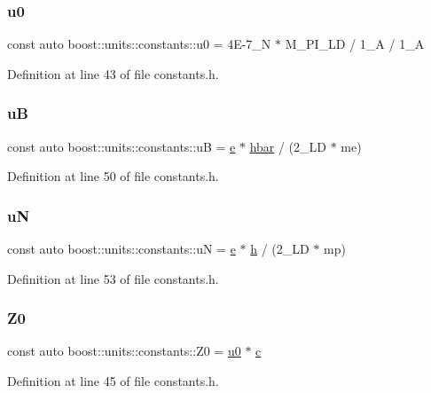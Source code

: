 \subsubsection{\texorpdfstring{u0}{u0}}
{\footnotesize\ttfamily const auto boost\+::units\+::constants\+::u0 = 4\+E-\/7\+\_\+\+N $\ast$ M\+\_\+\+P\+I\+\_\+\+L\+D / 1\+\_\+\+A / 1\+\_\+A}



Definition at line 43 of file constants.\+h.

\hypertarget{namespaceboost_1_1units_1_1constants_a872677eba6350c8679a44ffcec5f4af4}{}\label{namespaceboost_1_1units_1_1constants_a872677eba6350c8679a44ffcec5f4af4} 
\subsubsection{\texorpdfstring{uB}{uB}}
{\footnotesize\ttfamily const auto boost\+::units\+::constants\+::uB = \hyperlink{namespaceboost_1_1units_1_1constants_a0e10024b337b34c7f7300c67f0e9fcb1}{e} $\ast$ \hyperlink{namespaceboost_1_1units_1_1constants_a0203c96d139e639b8ee536cbc010c7bd}{hbar} / (2\+\_\+\+L\+D $\ast$ me)}



Definition at line 50 of file constants.\+h.

\hypertarget{namespaceboost_1_1units_1_1constants_a53dd16f6c94ac3e15d8db5725f0bd899}{}\label{namespaceboost_1_1units_1_1constants_a53dd16f6c94ac3e15d8db5725f0bd899} 
\subsubsection{\texorpdfstring{uN}{uN}}
{\footnotesize\ttfamily const auto boost\+::units\+::constants\+::uN = \hyperlink{namespaceboost_1_1units_1_1constants_a0e10024b337b34c7f7300c67f0e9fcb1}{e} $\ast$ \hyperlink{namespaceboost_1_1units_1_1constants_a744f5a50efb6701fcbde9527affd7776}{h} / (2\+\_\+\+L\+D $\ast$ mp)}



Definition at line 53 of file constants.\+h.

\hypertarget{namespaceboost_1_1units_1_1constants_a292ef44e5770a42d75796bef0fb74c73}{}\label{namespaceboost_1_1units_1_1constants_a292ef44e5770a42d75796bef0fb74c73} 
\subsubsection{\texorpdfstring{Z0}{Z0}}
{\footnotesize\ttfamily const auto boost\+::units\+::constants\+::\+Z0 = \hyperlink{namespaceboost_1_1units_1_1constants_a18461397bf032da161b03588a4ee3db9}{u0} $\ast$ \hyperlink{namespaceboost_1_1units_1_1constants_a1e4c07de84b2d43e7717eaada50b32de}{c}}



Definition at line 45 of file constants.\+h.


